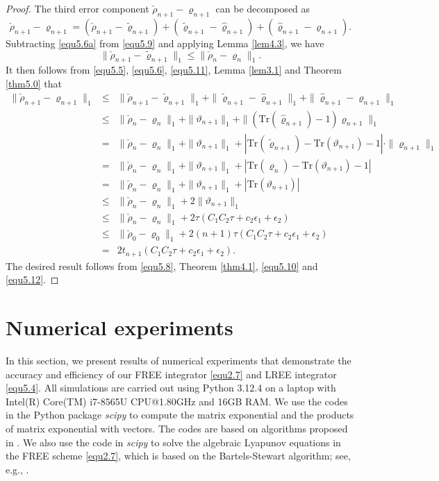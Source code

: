\documentclass[preprint,3p,compress,12pt]{elsarticle}
\numberwithin{equation}{section}
\numberwithin{figure}{section}
\begin{document}
\begin{proof}
The third error component $\check{\rho}_{n+1}-\varrho_{n+1}$ can be decomposed as
\begin{equation}\label{equ5.11}
  \check{\rho}_{n+1}-\varrho_{n+1}=(\check{\rho}_{n+1}-\tilde{\varrho}_{n+1})
  +(\tilde{\varrho}_{n+1}-\hat{\varrho}_{n+1})+(\hat{\varrho}_{n+1}-\varrho_{n+1}).
\end{equation}
Subtracting \eqref{equ5.6a} from \eqref{equ5.9} and applying Lemma \ref{lem4.3}, we have
\[\|\check{\rho}_{n+1}-\tilde{\varrho}_{n+1}\|_1\leq\|\check{\rho}_n-\varrho_n\|_1.\]
It then follows from \eqref{equ5.5}, \eqref{equ5.6}, \eqref{equ5.11}, Lemma \ref{lem3.1} and Theorem \ref{thm5.0} that
\begin{eqnarray}\label{equ5.12}
  \|\check{\rho}_{n+1}-\varrho_{n+1}\|_1&\leq& \|\check{\rho}_{n+1}-\tilde{\varrho}_{n+1}\|_1
  +\|\tilde{\varrho}_{n+1}-\hat{\varrho}_{n+1}\|_1+\|\hat{\varrho}_{n+1}-\varrho_{n+1}\|_1\nonumber\\
  &\leq& \|\check{\rho}_n-\varrho_n\|_1+\|\vartheta_{n+1}\|_1+\|(\mbox{Tr}(\hat{\varrho}_{n+1})-1)\varrho_{n+1}\|_1\nonumber\\
  &=&\|\check{\rho}_n-\varrho_n\|_1+\|\vartheta_{n+1}\|_1+|\mbox{Tr}(\tilde{\varrho}_{n+1})-\mbox{Tr}(\vartheta_{n+1})-1|\cdot\|\varrho_{n+1}\|_1\nonumber\\
  &=&\|\check{\rho}_n-\varrho_n\|_1+\|\vartheta_{n+1}\|_1+|\mbox{Tr}(\varrho_n)-\mbox{Tr}(\vartheta_{n+1})-1|\nonumber\\
  &=&\|\check{\rho}_n-\varrho_n\|_1+\|\vartheta_{n+1}\|_1+|\mbox{Tr}(\vartheta_{n+1})|\nonumber\\
  &\leq&\|\check{\rho}_n-\varrho_n\|_1+2\|\vartheta_{n+1}\|_1 \nonumber\\
  &\leq& \|\check{\rho}_n-\varrho_n\|_1+2\tau(C_1C_2\tau+c_2\epsilon_1+\epsilon_2)\nonumber\\
  &\leq&\|\check{\rho}_0-\varrho_0\|_1+2(n+1)\tau(C_1C_2\tau+c_2\epsilon_1+\epsilon_2)\nonumber\\
  &=&2t_{n+1}(C_1C_2\tau+c_2\epsilon_1+\epsilon_2).
\end{eqnarray}
The desired result follows from \eqref{equ5.8}, Theorem \ref{thm4.1}, \eqref{equ5.10} and
\eqref{equ5.12}.
\end{proof}

\section{Numerical experiments}
In this section, we present results of numerical experiments
that demonstrate the accuracy and efficiency of our FREE integrator \eqref{equ2.7} and LREE integrator \eqref{equ5.4}. All simulations are carried out using Python 3.12.4 on a laptop with Intel(R) Core(TM) i7-8565U CPU@1.80GHz and 16GB RAM. We use the codes in the Python package \emph{scipy} to compute the matrix exponential and the products of matrix exponential with vectors. The codes are based on algorithms proposed in \cite{Al-Mohy1,Al-Mohy2}. We also use the code in \emph{scipy} to solve the algebraic Lyapunov equations in the FREE scheme \eqref{equ2.7}, which is based on the Bartels-Stewart algorithm; see, e.g., \cite{Gajic,Hamilton}.
\end{document}
